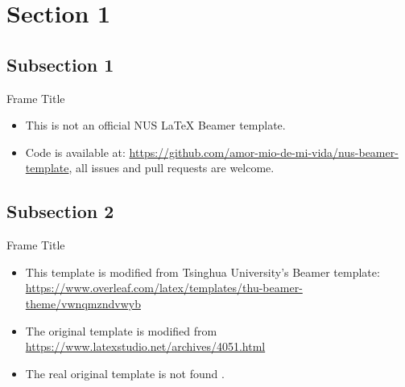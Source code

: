 \section{Section 1}

\subsection{Subsection 1}

\begin{frame}{Frame Title}
    \begin{itemize}[<+-| alert@+>] %
        \item This is not an official NUS \LaTeX{} Beamer template. 
        \item Code is available at: \url{https://github.com/amor-mio-de-mi-vida/nus-beamer-template}, all issues and pull requests are welcome.
    \end{itemize}
\end{frame}

\subsection{Subsection 2}

\begin{frame}{Frame Title}
    \begin{itemize}
        \item This template is modified from Tsinghua University's Beamer template: \url{https://www.overleaf.com/latex/templates/thu-beamer-theme/vwnqmzndvwyb} \pause
        \item The original template is modified from \newline \url{https://www.latexstudio.net/archives/4051.html}
        \item The real original template is not found \cite{origin}.
    \end{itemize}
\end{frame}
